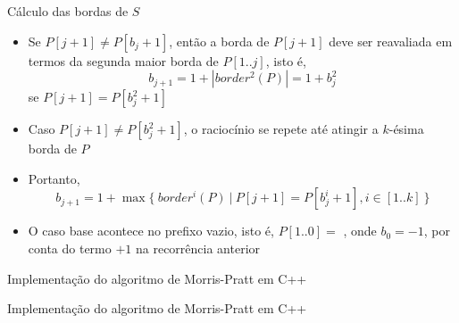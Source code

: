 \begin{frame}[fragile]{Cálculo das bordas de $S$}

    \begin{itemize}
        \item Se $P[j + 1] \neq P[b_j + 1]$, então a borda de $P[j + 1]$ deve ser reavaliada
            em termos da segunda maior borda de $P[1..j]$, isto é,
        \[
            b_{j + 1} = 1 + |border^2(P)| = 1 + b_j^2
        \]
        se $P[j + 1] = P[b_j^2 + 1]$

        \item Caso $P[j + 1] \neq P[b_j^2 + 1]$, o raciocínio se repete até atingir a $k$-ésima
            borda de $P$

        \item Portanto,
        \[
            b_{j + 1} = 1 + \max \lbrace\ border^i(P)\ |\ P[j + 1] = P[b_j^i + 1], i\in [1..k]\ \rbrace
        \]

        \item O caso base acontece no prefixo vazio, isto é, $P[1..0] = $ , onde
            $b_0 = -1$, por conta do termo $+1$ na recorrência anterior

    \end{itemize}

\end{frame}

\begin{frame}[fragile]{Implementação do algoritmo de Morris-Pratt em C++}
\end{frame}

\begin{frame}[fragile]{Implementação do algoritmo de Morris-Pratt em C++}
\end{frame}

